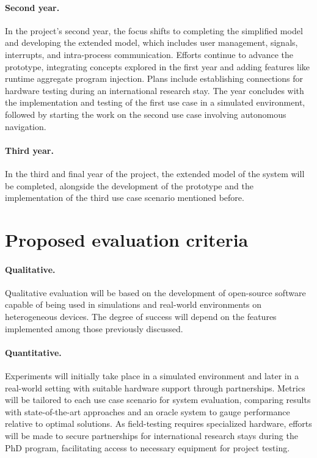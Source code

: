 \documentclass[12pt, a4paper]{article}
\begin{document}
\sloppypar
\paragraph{Second year.}
In the project's second year,
the focus shifts to completing the simplified model and developing the extended model,
which includes user management, signals, interrupts, and intra-process communication.
%
Efforts continue to advance the prototype,
integrating concepts explored in the first year and adding features like runtime aggregate program injection.
%
Plans include establishing connections for hardware testing during an international research stay.
%
The year concludes with the implementation and testing of the first use case in a simulated environment,
followed by starting the work on the second use case involving autonomous navigation.

\sloppypar
\paragraph{Third year.}
In the third and final year of the project,
the extended model of the system will be completed, alongside the development of the prototype
and the implementation of the third use case scenario mentioned before.

\section{Proposed evaluation criteria}
\label{sec:proposed-evaluation-criteria}

\sloppypar
\paragraph{Qualitative.}
Qualitative evaluation will be based on the development of open-source software capable of being used in simulations and real-world
environments on heterogeneous devices.
%
The degree of success will depend on the features implemented among those previously discussed.

\sloppypar
\paragraph{Quantitative.}
Experiments will initially take place in a simulated environment and later in a real-world setting with suitable
hardware support through partnerships.
%
Metrics will be tailored to each use case scenario for system evaluation,
comparing results with state-of-the-art approaches and an oracle system to gauge performance relative to optimal solutions.
%
As field-testing requires specialized hardware,
efforts will be made to secure partnerships for international research stays during the PhD program,
facilitating access to necessary equipment for project testing.
\end{document}
